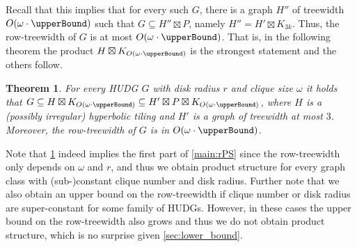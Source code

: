 \documentclass[11pt]{article}
\newtheorem{theorem}{Theorem}
\newcommand{\calP}{\ensuremath{\mathcal{P}}\xspace}
\begin{document}
Recall that this implies that for every such $ G $, there is a graph $ H'' $ of treewidth $ O(\omega \cdot \upperBound) $ such that $ G \subseteq H'' \boxtimes P $, namely $ H'' = H' \boxtimes K_{3k} $.
Thus, the row-treewidth of $ G $ is at most $ O(\omega \cdot \upperBound) $.
That is, in the following theorem the product $ H \boxtimes K_{O(\omega \cdot \upperBound)} $ is the strongest statement and the others follow.
%
\begin{theorem}\label{thm:upper_bound}
    For every HUDG $ G $ with disk radius $ r $ and clique size $ \omega $ it holds that $ G \subseteq H \boxtimes K_{O(\omega \cdot \upperBound)} \subseteq H' \boxtimes P \boxtimes K_{O(\omega \cdot \upperBound)}$, where $ H $ is a (possibly irregular) hyperbolic tiling and $ H' $ is a graph of treewidth at most $ 3 $.
    Moreover, the row-treewidth of $ G $ is in $ O(\omega \cdot \upperBound) $.
\end{theorem}
%
Note that \cref{thm:upper_bound} indeed implies the first part of \cref{main:rPS}
since the row-treewidth only depends on $ \omega $ and $ r $, and thus we obtain product structure for every graph class with (sub-)constant clique number and disk radius.
Further note that we also obtain an upper bound on the row-treewidth if clique number or disk radius are super-constant for some family of HUDGs.
However, in these cases the upper bound on the row-treewidth also grows and thus we do not obtain product structure, which is no surprise given \cref{sec:lower_bound}.
%
\end{document}
